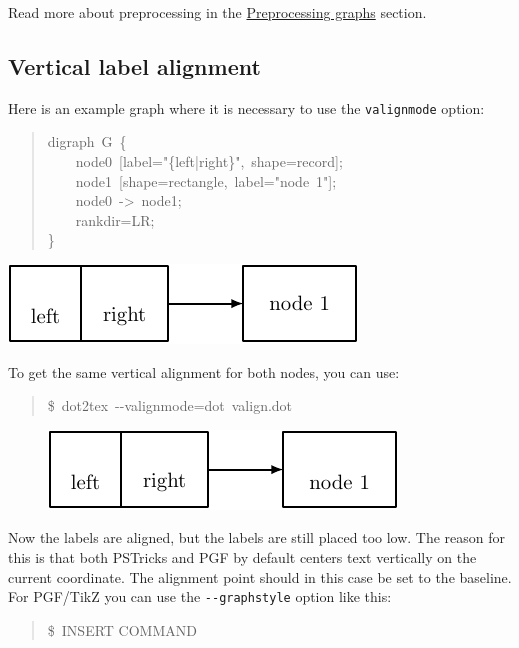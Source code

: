 \documentclass[10pt,a4paper,english]{article}
\begin{document}
Read more about preprocessing in the \href{\#preprocessing-graphs}{Preprocessing graphs} section.



\hypertarget{vertical-label-alignment}{}
\subsection*{Vertical label alignment}
\label{vertical-label-alignment}



Here is an example graph where it is necessary to use the \texttt{valignmode} option:
\begin{quote}{\ttfamily \raggedright \noindent
digraph~G~{\{}~\\
~~~~node0~{[}label="{\{}left|right{\}}",~shape=record{]};~\\
~~~~node1~{[}shape=rectangle,~label="node~1"{]};~\\
~~~~node0~->~node1;~\\
~~~~rankdir=LR;~\\
{\}}
}\end{quote}

\centering

\includegraphics{pdf/valignmode0}

To get the same vertical alignment for both nodes, you can use:
\begin{quote}{\ttfamily \raggedright \noindent
{\$}~dot2tex~-{}-valignmode=dot~valign.dot
}\end{quote}
\begin{figure}[H]
\centering

\includegraphics{pdf/valignmode1}
\end{figure}

Now the labels are aligned, but the labels are still placed too low. The reason for this is that both PSTricks and PGF by default centers text vertically on the current coordinate. The alignment point should in this case be set to the baseline. For PGF/TikZ you can use the \texttt{-{}-graphstyle} option like this:
\begin{quote}{\ttfamily \raggedright \noindent
{\$}~INSERT COMMAND
}\end{quote}
\end{document}
